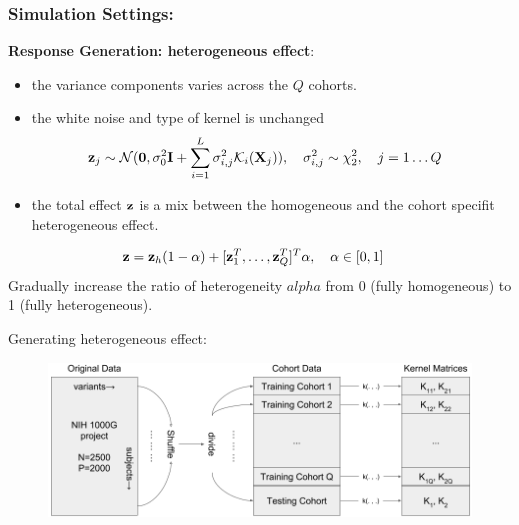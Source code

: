 \documentclass{beamer}
\begin{document}
\begin{frame}
  \frametitle{Simulation Settings:} %
  \textbf{Response Generation: heterogeneous effect}:\\
  \begin{itemize}
  \item the variance components varies across the $Q$ cohorts.
  \item the white noise and type of kernel is unchanged
    \begin{align*}
      \mathbf{z}_j & \sim \mathcal{N}(\boldsymbol{0}, \sigma^2_0 \textbf{I} + \sum_{i=1}^L
              \sigma_{i,j}^2 \mathcal{K}_i(\mathbf{X}_j)), \quad
              \sigma_{i,j}^2 \sim \chi_2^2, \quad
              j = 1 \dots Q
    \end{align*}
  \item the total effect $\mathbf{z}$ is a mix between the homogeneous and
    the cohort specifit heterogeneous effect.
  \end{itemize}
  \begin{align*}
    \mathbf{z} & = \mathbf{z}_h (1-\alpha) + [\mathbf{z}_1^T, \dots, \mathbf{z}_Q^T]^T \alpha,
          \quad \alpha \in [0, 1]
  \end{align*}
  Gradually increase the ratio of heterogeneity $alpha$ from 0 (fully
  homogeneous) to 1 (fully heterogeneous).
\end{frame}
\begin{frame}
  Generating heterogeneous effect:
  \begin{figure}
    \centering
    \includegraphics[width=\linewidth]{kma_sim_1kg.png}
  \end{figure}
\end{frame}
\end{document}
